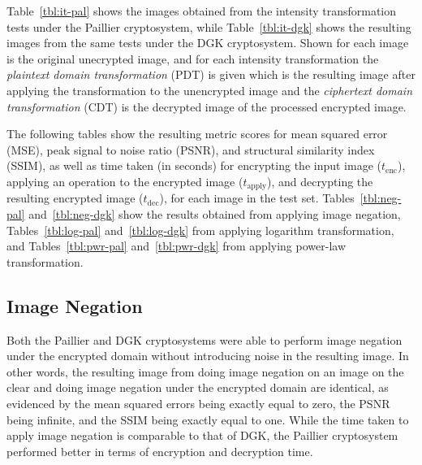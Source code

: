 Table~\ref{tbl:it-pal} shows the images obtained from the intensity transformation tests under the Paillier cryptosystem, while Table~\ref{tbl:it-dgk} shows the resulting images from the same tests under the DGK cryptosystem. Shown for each image is the original unecrypted image, and for each intensity transformation the \textit{plaintext domain transformation} (PDT) is given which is the resulting image after applying the transformation to the unencrypted image and the \textit{ciphertext domain transformation} (CDT) is the decrypted image of the processed encrypted image.

The following tables show the resulting metric scores for mean squared error (MSE), peak signal to noise ratio (PSNR), and structural similarity index (SSIM), as well as time taken (in seconds) for encrypting the input image ($t_\text{enc}$), applying an operation to the encrypted image ($t_\text{apply}$), and decrypting the resulting encrypted image ($t_\text{dec}$), for each image in the test set. Tables~\ref{tbl:neg-pal} and~\ref{tbl:neg-dgk} show the results obtained from applying image negation, Tables~\ref{tbl:log-pal} and~\ref{tbl:log-dgk} from applying logarithm transformation, and Tables~\ref{tbl:pwr-pal} and~\ref{tbl:pwr-dgk} from applying power-law transformation.

\subsection{Image Negation}
Both the Paillier and DGK cryptosystems were able to perform image negation under the encrypted domain without introducing noise in the resulting image. In other words, the resulting image from doing image negation on an image on the clear and doing image negation under the encrypted domain are identical, as evidenced by the mean squared errors being exactly equal to zero, the PSNR being infinite, and the SSIM being exactly equal to one. While the time taken to apply image negation is comparable to that of DGK, the Paillier cryptosystem performed better in terms of encryption and decryption time.


